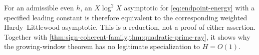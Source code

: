 For an admissible even $h$, an $X\log^2X$ asymptotic for
\eqref{eq:endpoint-energy} with a specified leading constant is therefore
equivalent to the corresponding weighted Hardy--Littlewood asymptotic.
This is a reduction, not a proof of either assertion.  Together with
\cref{thm:sign-coherent-family,thm:quadratic-prime-ray}, it shows why the
growing-window theorem has no legitimate specialization to $H=O(1)$.
